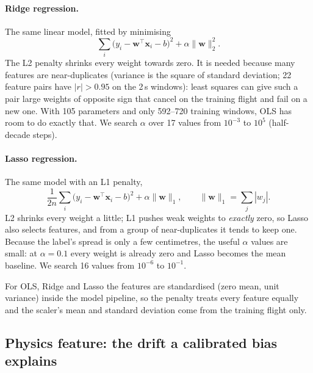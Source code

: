 \paragraph{Ridge regression.}
The same linear model, fitted by minimising
\begin{equation}
  \sum_{i} \bigl(y_i - \mathbf{w}^\top \mathbf{x}_i - b\bigr)^2
  + \alpha \lVert \mathbf{w} \rVert_2^2 .
\end{equation}
The L2 penalty shrinks every weight towards zero. It is needed because many
features are near-duplicates (variance is the square of standard deviation;
22 feature pairs have $|r| > 0.95$ on the 2\,s windows): least squares can give such a pair large
weights of opposite sign that cancel on the training flight and fail on a new
one. With 105 parameters and only 592--720 training windows, OLS has room to
do exactly that. We search $\alpha$ over 17 values from $10^{-3}$ to $10^{5}$
(half-decade steps).

\paragraph{Lasso regression.}
The same model with an L1 penalty,
\begin{equation}
  \frac{1}{2n}\sum_{i} \bigl(y_i - \mathbf{w}^\top \mathbf{x}_i - b\bigr)^2
  + \alpha \lVert \mathbf{w} \rVert_1 ,
  \qquad \lVert \mathbf{w} \rVert_1 = \textstyle\sum_j |w_j| .
\end{equation}
L2 shrinks every weight a little; L1 pushes weak weights to \emph{exactly}
zero, so Lasso also selects features, and from a group of near-duplicates it
tends to keep one. Because the label's spread is only a few centimetres, the
useful $\alpha$ values are small: at $\alpha = 0.1$ every weight is already
zero and Lasso becomes the mean baseline. We search 16 values from $10^{-6}$
to $10^{-1}$.

For OLS, Ridge and Lasso the features are standardised (zero mean, unit
variance) inside the model pipeline, so the penalty treats every feature
equally and the scaler's mean and standard deviation come from the training
flight only.

\subsection{Physics feature: the drift a calibrated bias explains}
\label{sec:physics-feature}

